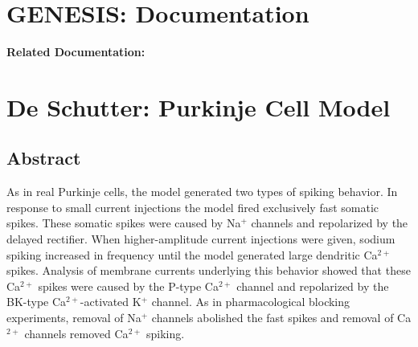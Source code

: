 \documentclass[12pt]{article}
\begin{document}
\section*{GENESIS: Documentation}

{\bf Related Documentation:}

\section*{De Schutter: Purkinje Cell Model}

\subsection*{Abstract}

As in real Purkinje cells, the model generated two types of
spiking behavior. In response to small current injections the
model fired exclusively fast somatic spikes. These somatic spikes
were caused by Na$^+$ channels and repolarized by the delayed rectifier.
When higher-amplitude current injections were given, sodium
spiking increased in frequency until the model generated
large dendritic Ca$^{2+}$ spikes. Analysis of membrane currents underlying this 
behavior showed that these Ca$^{2+}$ spikes were caused by
the P-type Ca$^{2+}$ channel and repolarized by the BK-type Ca$^{2+}$-activated
K$^+$ channel. As in pharmacological blocking experiments,
removal of Na$^+$ channels abolished the fast spikes and removal of
Ca$^{2+}$ channels removed Ca$^{2+}$ spiking.
\end{document}
